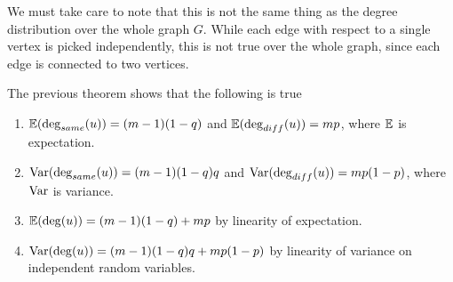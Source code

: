 We must take care to note that this is not the same thing as the degree distribution over the whole
graph $G$. While each edge with respect to a single vertex is picked independently, this is not true
over the whole graph, since each edge is connected to two vertices.

\begin{remark}
  The previous theorem shows that the following is true
  \begin{enumerate}
  \item $\mathbb{E}(\deg_{same}(u)) = (m-1)(1-q)$ and $\mathbb{E}(\deg_{diff}(u)) = mp$, where $\mathbb{E}$ is expectation.
  \item $\mathrm{Var}(\deg_{same}(u)) = (m-1)(1-q)q$ and $\mathrm{Var}(\deg_{diff}(u)) = mp(1-p)$, where $\mathrm{Var}$ is
    variance.
  \item $\mathbb{E}(\deg(u)) = (m-1)(1-q) + mp$ by linearity of expectation.
  \item $\mathrm{Var}(\deg(u)) = (m-1)(1-q)q + mp(1-p)$ by linearity of variance on independent random
    variables.
  \end{enumerate}
\end{remark}






